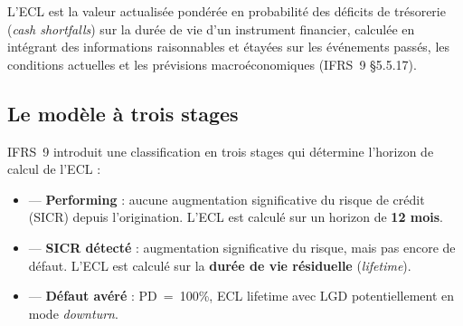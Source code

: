 \documentclass[12pt,a4paper]{article}
\begin{document}
\begin{definitionbox}
L'ECL est la valeur actualis\'ee pond\'er\'ee en probabilit\'e des d\'eficits de tr\'esorerie (\textit{cash shortfalls}) sur la dur\'ee de vie d'un instrument financier, calcul\'ee en int\'egrant des informations raisonnables et \'etay\'ees sur les \'ev\'enements pass\'es, les conditions actuelles et les pr\'evisions macro\'economiques (IFRS~9 \S5.5.17).
\end{definitionbox}

\subsection{Le mod\`ele \`a trois stages}

IFRS~9 introduit une classification en trois stages qui d\'etermine l'horizon de calcul de l'ECL :

\begin{center}
\end{center}

\begin{itemize}[leftmargin=2cm]
    \item[\textbf{Stage 1}] --- \textbf{Performing} : aucune augmentation significative du risque de cr\'edit (SICR) depuis l'origination. L'ECL est calcul\'e sur un horizon de \textbf{12 mois}.
    \item[\textbf{Stage 2}] --- \textbf{SICR d\'etect\'e} : augmentation significative du risque, mais pas encore de d\'efaut. L'ECL est calcul\'e sur la \textbf{dur\'ee de vie r\'esiduelle} (\textit{lifetime}).
    \item[\textbf{Stage 3}] --- \textbf{D\'efaut av\'er\'e} : PD~=~100\%, ECL lifetime avec LGD potentiellement en mode \textit{downturn}.
\end{itemize}
\end{document}
